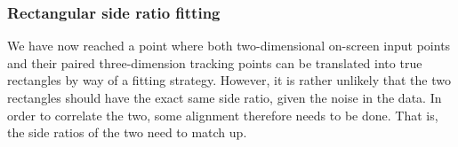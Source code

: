 
%






%
%
%
%
%
%
%
%
%
%
%
%










\subsubsection{Rectangular side ratio fitting}



%

We have now reached a point where both two-dimensional on-screen input points and their paired three-dimension tracking points can be translated into  true rectangles by way of a fitting strategy. However, it is rather unlikely that the two rectangles should have the exact same side ratio, given the noise in the data. In order to correlate the two, some alignment therefore needs to be done. That is, the side ratios of the two need to match up.

